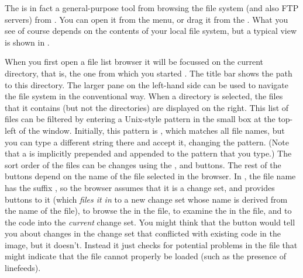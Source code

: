 \documentclass[a4paper,10pt,twoside]{book}
\begin{document}
The  is in fact a general-purpose tool from browsing the file system (and also FTP servers) from \sq. 
You can open it from the  menu, or drag it from the \toolsflapind.
What you see of course depends on the contents of your local file system, but a typical view is shown in .

When you first open a file list browser it will be focussed on the current directory, that is, the one from which you started \sq. The title bar shows the path to this directory.
The larger pane on the left-hand side can be used to navigate the file system in the conventional way.
When a directory is selected, the files that it contains (but not the directories) are displayed on the right.
This list of files can be filtered by entering a Unix-style pattern in the small box at the top-left of the window.  
Initially, this pattern is \ct{*}, which matches all file names, but you can type a different string there and accept it, changing the pattern.  (Note that a \ct{*} is implicitly prepended and appended to the pattern that you type.)
The sort order of the files can be changes using the ,  and  buttons.
The rest of the buttons depend on the name of the file selected in the browser.
In , the file name has the suffix , so the browser assumes that it is a change set, and provides buttons to  it (which \textit{files it in} to a new change set whose name is derived from the name of the file),  to browse the  in the file, to examine the  in the file, 
and to  the code into the \emph{current} change set.
You might think that the  button would tell you about changes in the change set that conflicted with existing code in the image, but it doesn't.
Instead it just checks for potential problems in the file that might indicate that the file cannot properly be loaded (such as the presence of linefeeds).
\end{document}
